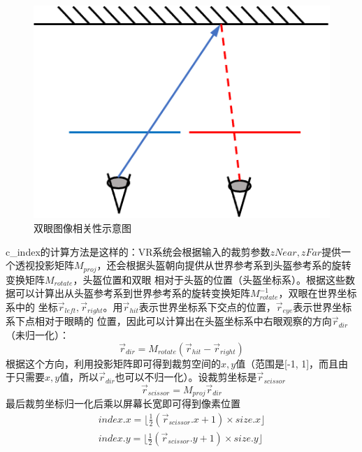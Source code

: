 \documentclass[UTF8]{ctexart}
\begin{document}
        \begin{figure}[htbp]
        \centering
        \includegraphics[scale=0.6]{pic/BinocularCorrelation.png}
        \caption{双眼图像相关性示意图}
        \label{fig:3}
        \end{figure}
        
        c\_index的计算方法是这样的：VR系统会根据输入的裁剪参数$zNear, zFar$提供一个透视投影矩阵$M_{proj}$，还会根据头盔朝向提供从世界参考系到头盔参考系的旋转变换矩阵$M_{rotate}$，头盔位置和双眼
        相对于头盔的位置（头盔坐标系）。根据这些数据可以计算出从头盔参考系到世界参考系的旋转变换矩阵$M^{-1}_{rotate}$，双眼在世界坐标系中的
        坐标$\overrightarrow{r}_{left}, \overrightarrow{r}_{right}$。用$\overrightarrow{r}_{hit}$表示世界坐标系下交点的位置，$\overrightarrow{r}_{eye}$表示世界坐标系下点相对于眼睛的
        位置，因此可以计算出在头盔坐标系中右眼观察的方向$\overrightarrow{r}_{dir}$（未归一化）：
        \begin{equation}
            \overrightarrow{r}_{dir}=M_{rotate}(\overrightarrow{r}_{hit}-\overrightarrow{r}_{right})
        \end{equation}
        根据这个方向，利用投影矩阵即可得到裁剪空间的$x,y$值（范围是[-1, 1]，而且由于只需要$x, y$值，所以$\overrightarrow{r}_{dir}$也可以不归一化）。设裁剪坐标是$\overrightarrow{r}_{scissor}$
        \begin{equation}
            \overrightarrow{r}_{scissor}=M_{proj}\overrightarrow{r}_{dir}
        \end{equation}
        最后裁剪坐标归一化后乘以屏幕长宽即可得到像素位置
        \begin{equation}
            \begin{array}{c}
                index.x=\lfloor\frac{1}{2}(\overrightarrow{r}_{scissor}.x+1)\times size.x\rfloor\\
                index.y=\lfloor\frac{1}{2}(\overrightarrow{r}_{scissor}.y+1)\times size.y\rfloor\\
            \end{array}
        \end{equation}
        
\end{document}
